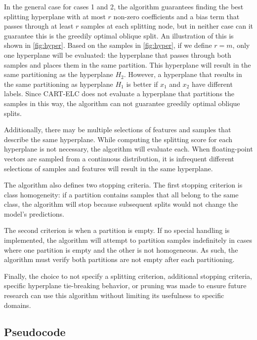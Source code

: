 \documentclass[10pt]{article} %
\begin{document}
In the general case for cases 1 and 2, the algorithm guarantees finding the best splitting hyperplane with at most $r$ non-zero coefficients and a bias term that passes through at least $r$ samples at each splitting node, but in neither case can it guarantee this is the greedily optimal oblique split. An illustration of this is shown in \autoref{fig:hyper}. Based on the samples in \autoref{fig:hyper}, if we define $r = m$, only one hyperplane will be evaluated: the hyperplane that passes through both samples and places them in the same partition. This hyperplane will result in the same partitioning as the hyperplane $H_2$. However, a hyperplane that results in the same partitioning as hyperplane $H_1$ is better if $x_1$ and $x_2$ have different labels. Since CART-ELC does not evaluate a hyperplane that partitions the samples in this way, the algorithm can not guarantee greedily optimal oblique splits. 

Additionally, there may be multiple selections of features and samples that describe the same hyperplane. While computing the splitting score for each hyperplane is not necessary, the algorithm will evaluate each. When floating-point vectors are sampled from a continuous distribution, it is infrequent different selections of samples and features will result in the same hyperplane.

The algorithm also defines two stopping criteria. The first stopping criterion is class homogeneity: if a partition contains samples that all belong to the same class, the algorithm will stop because subsequent splits would not change the model's predictions.

The second criterion is when a partition is empty. If no special handling is implemented, the algorithm will attempt to partition samples indefinitely in cases where one partition is empty and the other is not homogeneous. As such, the algorithm must verify both partitions are not empty after each partitioning.

Finally, the choice to not specify a splitting criterion, additional stopping criteria, specific hyperplane tie-breaking behavior, or pruning was made to ensure future research can use this algorithm without limiting its usefulness to specific domains.

\subsection{Pseudocode}\label{Pseudocode}
\end{document}
